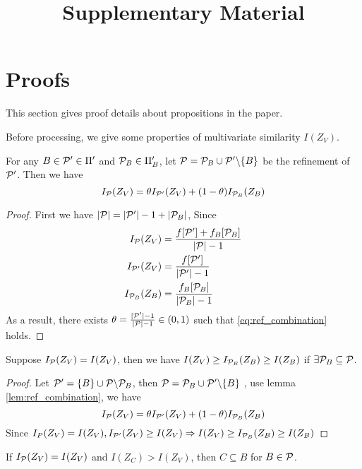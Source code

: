 \documentclass{article}
\title{Supplementary Material}
\begin{document}
\maketitle
\appendix
\section{Proofs}
This section gives proof details about propositions in the paper.

Before processing, we give some properties of multivariate similarity $I(Z_V)$.
\begin{lemma}\label{lem:ref_combination}
For any $B \in \P' \in \Pi'$ and $\P_B \in \Pi'_B$, let $\P = \P_B \cup \P' \backslash \{B\} $
be the refinement of $\P'$. Then we have
\begin{equation}\label{eq:ref_combination}
I_{\P}(Z_V) = \theta I_{\P'}(Z_V) + (1-\theta) I_{\P_B}(Z_B)
\end{equation}
\end{lemma}
\begin{proof}
	First we have $\abs{\P} = \abs{\P'} -1 + \abs{\P_B}$,
	Since
	\begin{align*}
		I_{\P}(Z_V) & = { f[\P'] + f_B[\P_B] \over \abs{\P} - 1} \\
		I_{\P'}(Z_V) & = { f[\P'] \over \abs{\P'} - 1} \\
		I_{\P_B}(Z_B) & = { f_B[\P_B] \over \abs{\P_B} - 1}
	\end{align*}
	As a result, there exists $\theta = {\abs{\P'} - 1 \over \abs{\P} - 1} \in (0,1)$ such that 
	\eqref{eq:ref_combination} holds.
\end{proof}
\begin{lemma}\label{lem:smallZB}
Suppose $I_{\P}(Z_V) = I(Z_V)$, then we have $I(Z_V) \geq I_{\P_B}(Z_B) \geq I(Z_B)$ if $\exists \P_B \subseteq \P$.
\end{lemma}
\begin{proof}
Let $\P' = \{B\} \cup \P\backslash \P_B$, then $\P = \P_B \cup \P'\backslash\{B\}$ , use lemma \ref{lem:ref_combination}, we have
\begin{equation}
I_{\P}(Z_V) = \theta I_{\P'}(Z_V) + (1-\theta) I_{\P_B}(Z_B)
\end{equation}
Since  $I_{P}(Z_V) = I(Z_V), I_{\P'}(Z_V)\geq I(Z_V) \Rightarrow I(Z_V) \geq I_{\P_B}(Z_B) \geq I(Z_B)$ 
\end{proof}
\begin{lemma}\label{lem:LargeIZV}
	If $I_{\P}(Z_V)=I(Z_V)$ and $I(Z_C) > I(Z_V)$, then $C\subseteq B$ for $B \in \P$.
\end{lemma}
\end{document}
